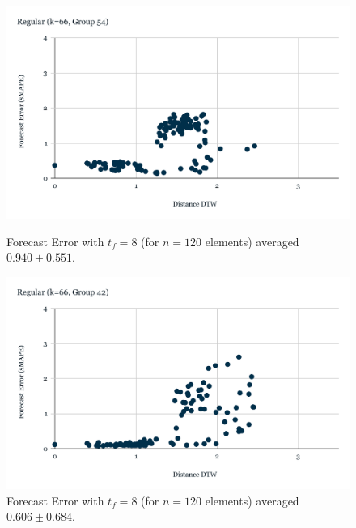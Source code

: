 \begin{figure}[!tbp]
  \centering
  \begin{minipage}[b]{0.45\textwidth}
    \includegraphics[width=\textwidth]{../Figures/distDTW_ForecastError_r66_c54}
    \caption{Forecast Error with $t_{f}=8$ (for $n=120$ elements) averaged $0.940 \pm 0.551$.}
    \label{Fig:DTWsMAPE_r66_g54}
  \end{minipage}
  \hfill
  \begin{minipage}[b]{0.45\textwidth}
    \includegraphics[width=\textwidth]{../Figures/distDTW_ForecastError_r66_c42}
    \caption{Forecast Error with $t_{f}=8$ (for $n=120$ elements) averaged $0.606 \pm 0.684$.}
    \label{Fig:DTWsMAPE_r66_g42}
  \end{minipage}


\end{figure}
